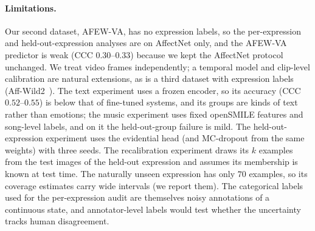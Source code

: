 \paragraph{Limitations.} Our second dataset, AFEW-VA, has no expression labels,
so the per-expression and held-out-expression analyses are on AffectNet only, and
the AFEW-VA predictor is weak (CCC $0.30$--$0.33$) because we kept the AffectNet
protocol unchanged. We treat video frames independently; a temporal model and
clip-level calibration are natural extensions, as is a third dataset with
expression labels (Aff-Wild2~\cite{kollias2019affwild2}). The text experiment uses a frozen encoder, so its accuracy (CCC
$0.52$--$0.55$) is below that of fine-tuned systems, and its groups are kinds
of text rather than emotions; the music experiment uses fixed openSMILE
features and song-level labels, and on it the held-out-group failure is mild. The held-out-expression
experiment uses the evidential head (and MC-dropout from the same weights) with three seeds. The recalibration experiment draws its $k$
examples from the test images of the held-out expression and assumes its
membership is known at test time. The naturally unseen
expression has only $70$ examples, so its coverage estimates carry wide intervals
(we report them). The categorical labels used for the per-expression audit are
themselves noisy annotations of a continuous state, and annotator-level labels
would test whether the uncertainty tracks human disagreement.
